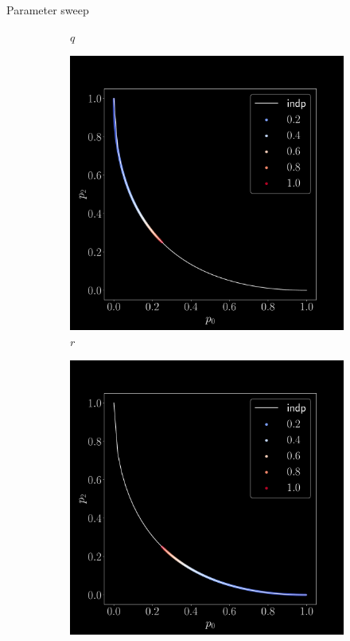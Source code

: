 \documentclass[aspectratio=169,9pt]{beamer}
\begin{document}
\begin{frame}{Parameter sweep}
\begin{figure}[h]
\begin{adjustwidth}{-7cm}{-7cm}
\begin{subfigure}[b]{0.2\textwidth}
        \caption{$q$}
      \end{subfigure}\pause
      \begin{subfigure}[b]{0.2\textwidth}
        \centering
        \includegraphics[width=\textwidth]{sweep-r}
        \caption{$r$}
      \end{subfigure}\pause
      \begin{subfigure}[b]{0.2\textwidth}
        \centering
        \includegraphics[width=\textwidth]{sweep-s}

\end{subfigure}
\end{adjustwidth}
\end{figure}
\end{frame}
\end{document}
